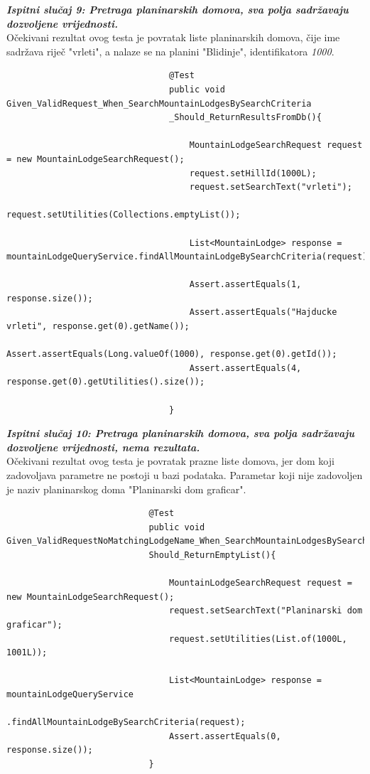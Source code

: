 				\textbf{\textit{Ispitni slučaj 9: Pretraga planinarskih domova, sva polja sadržavaju dozvoljene vrijednosti.}}\\
				Očekivani rezultat ovog testa je povratak liste planinarskih domova, čije ime sadržava riječ "vrleti", a nalaze se na planini "Blidinje", identifikatora \textit{1000}.\\
				
							
							\begin{lstlisting}
								@Test
								public void Given_ValidRequest_When_SearchMountainLodgesBySearchCriteria
								_Should_ReturnResultsFromDb(){
									
									MountainLodgeSearchRequest request = new MountainLodgeSearchRequest();
									request.setHillId(1000L);
									request.setSearchText("vrleti");
									request.setUtilities(Collections.emptyList());
									
									List<MountainLodge> response = mountainLodgeQueryService.findAllMountainLodgeBySearchCriteria(request);
									
									Assert.assertEquals(1, response.size());
									Assert.assertEquals("Hajducke vrleti", response.get(0).getName());
									Assert.assertEquals(Long.valueOf(1000), response.get(0).getId());
									Assert.assertEquals(4, response.get(0).getUtilities().size());
									
								}
							\end{lstlisting}
						
						\textbf{\textit{Ispitni slučaj 10: Pretraga planinarskih domova, sva polja sadržavaju dozvoljene vrijednosti, nema rezultata.}}\\
						Očekivani rezultat ovog testa je povratak prazne liste domova, jer dom koji zadovoljava parametre ne postoji u bazi podataka. Parametar koji nije zadovoljen je naziv planinarskog doma "Planinarski dom graficar".\\
						
						\begin{lstlisting}
							@Test
							public void Given_ValidRequestNoMatchingLodgeName_When_SearchMountainLodgesBySearchCriteria_
							Should_ReturnEmptyList(){
								
								MountainLodgeSearchRequest request = new MountainLodgeSearchRequest();
								request.setSearchText("Planinarski dom graficar");
								request.setUtilities(List.of(1000L, 1001L));
								
								List<MountainLodge> response = mountainLodgeQueryService
								.findAllMountainLodgeBySearchCriteria(request);
								Assert.assertEquals(0, response.size());
							}
						\end{lstlisting}
					
